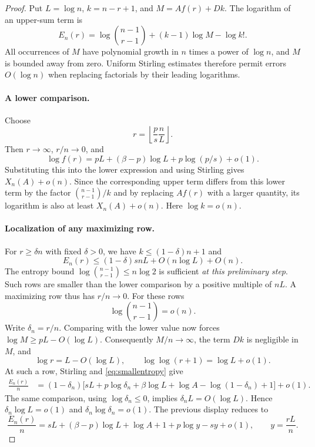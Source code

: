 \documentclass[11pt,a4paper]{article}
\numberwithin{equation}{section}
\theoremstyle{definition}
\theoremstyle{remark}
\begin{document}
\begin{proof}
Put $L=\log n$, $k=n-r+1$, and
$M=A f(r)+Dk$.  The logarithm of an upper-sum term is
\begin{equation}
 E_n(r)=\log\binom{n-1}{r-1}+(k-1)\log M-\log k!.
 \label{eq:En}
\end{equation}
All occurrences of $M$ have polynomial growth in $n$ times a power of
$\log n$, and $M$ is bounded away from zero.  Uniform Stirling estimates
therefore permit errors $O(\log n)$ when replacing factorials by their
leading logarithms.

\paragraph{A lower comparison.}
Choose
\[
 r=\left\lfloor\frac p s\frac nL\right\rfloor.
\]
Then $r\to\infty$, $r/n\to0$, and
\[
 \log f(r)=pL+(\beta-p)\log L+p\log(p/s)+o(1).
\]
Substituting this into the lower expression and using Stirling gives
$X_n(A)+o(n)$.  Since the corresponding upper term differs from this
lower term by the factor $\binom{n-1}{r-1}/k$ and by replacing
$Af(r)$ with a larger quantity, its logarithm is also at least
$X_n(A)+o(n)$.  Here $\log k=o(n)$.

\paragraph{Localization of any maximizing row.}
For $r\ge\delta n$ with fixed $\delta>0$, we have
$k\le(1-\delta)n+1$ and
\[
 E_n(r)\le(1-\delta)s nL+O(n\log L)+O(n).
\]
The entropy bound $\log\binom{n-1}{r-1}\le n\log2$ is sufficient
\emph{at this preliminary step}.  Such rows are smaller than the lower
comparison by a positive multiple of $nL$.  A maximizing row thus has
$r/n\to0$.  For these rows
\begin{equation}
 \log\binom{n-1}{r-1}=o(n).
 \label{eq:smallentropy}
\end{equation}
Write $\delta_n=r/n$.  Comparing with the lower value now forces
$\log M\ge pL-O(\log L)$.  Consequently $M/n\to\infty$, the term $Dk$
is negligible in $M$, and
\[
 \log r=L-O(\log L),\qquad
 \log\log(r+1)=\log L+o(1).
\]
At such a row, Stirling and \eqref{eq:smallentropy} give
\begin{align*}
 \frac{E_n(r)}n
  &=(1-\delta_n)\bigl[sL+p\log\delta_n+\beta\log L
             +\log A-\log(1-\delta_n)+1\bigr]+o(1).
\end{align*}
The same comparison, using $\log\delta_n\le0$, implies
$\delta_n L=O(\log L)$.  Hence
$\delta_n\log L=o(1)$ and $\delta_n\log\delta_n=o(1)$.
The previous display reduces to
\begin{equation}
 \frac{E_n(r)}n
 =sL+(\beta-p)\log L+\log A+1
      +p\log y-sy+o(1),
 \qquad y=\frac{rL}{n}.
 \label{eq:saddlefunctional}
\end{equation}


\end{proof}
\end{document}
